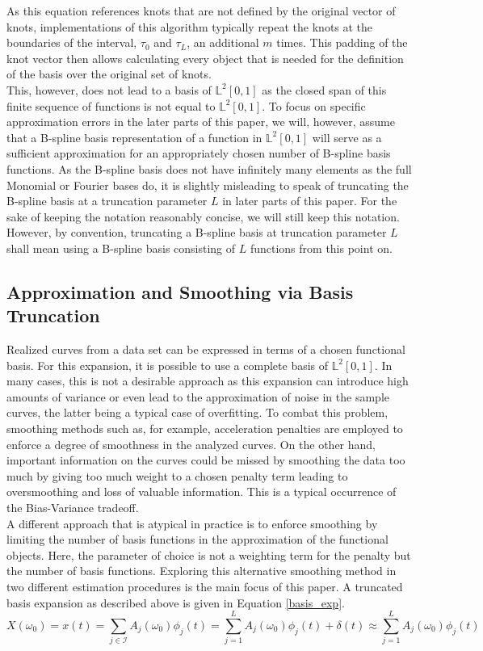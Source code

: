 \documentclass[11pt,twoside,a4paper]{article}
\begin{document}
	As this equation references knots that are not defined by the original vector of knots, implementations of this algorithm typically repeat the knots at the boundaries of the interval, $\tau_0$ and $\tau_L$, an additional $m$ times. This padding of the knot vector then allows calculating every object that is needed for the definition of the basis over the original set of knots.\\	
	This, however, does not lead to a basis of $\mathbb{L}^2[0,1]$ as the closed span of this finite sequence of functions is not equal to $\mathbb{L}^2[0,1]$. To focus on specific approximation errors in the later parts of this paper, we will, however, assume that a B-spline basis representation of a function in $\mathbb{L}^2[0,1]$ will serve as a sufficient approximation for an appropriately chosen number of B-spline basis functions. 
	As the B-spline basis does not have infinitely many elements as the full Monomial or Fourier bases do, it is slightly misleading to speak of truncating the B-spline basis at a truncation parameter $L$ in later parts of this paper. For the sake of keeping the notation reasonably concise, we will still keep this notation. However, by convention, truncating a B-spline basis at truncation parameter $L$ shall mean using a B-spline basis consisting of $L$ functions from this point on.
	
	\subsection{Approximation and Smoothing via Basis Truncation}
	Realized curves from a data set can be expressed in terms of a chosen functional basis. For this expansion, it is possible to use a complete basis of $\mathbb{L}^2[0,1]$. In many cases, this is not a desirable approach as this expansion can introduce high amounts of variance or even lead to the approximation of noise in the sample curves, the latter being a typical case of overfitting. To combat this problem, smoothing methods such as, for example, acceleration penalties are employed to enforce a degree of smoothness in the analyzed curves. On the other hand, important information on the curves could be missed by smoothing the data too much by giving too much weight to a chosen penalty term leading to oversmoothing and loss of valuable information. This is a typical occurrence of the Bias-Variance tradeoff.\\
	
	A different approach that is atypical in practice is to enforce smoothing by limiting the number of basis functions in the approximation of the functional objects. Here, the parameter of choice is not a weighting term for the penalty but the number of basis functions. Exploring this alternative smoothing method in two different estimation procedures is the main focus of this paper. A truncated basis expansion as described above is given in Equation \ref{basis_exp}.
	\begin{equation}\label{basis_exp}
		X(\omega_0) = x(t) = \sum_{j \in \mathcal{I}} A_j(\omega_0) \phi_j(t) = \sum_{j = 1}^{L} A_j(\omega_0) \phi_j(t) + \delta(t) \approx \sum_{j = 1}^{L} A_j(\omega_0) \phi_j(t)
	\end{equation}
\end{document}
